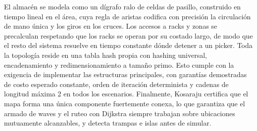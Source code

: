 \documentclass[11pt,a4paper]{article}
\theoremstyle{definition}
\begin{document}
El almacén se modela como un dígrafo ralo de celdas de pasillo, construido en tiempo lineal en el área, cuya regla de aristas codifica con precisión la circulación de mano única y los giros en los cruces. Los accesos a racks y zonas se precalculan respetando que los racks se operan por su costado largo, de modo que el resto del sistema resuelve en tiempo constante dónde detener a un picker. Toda la topología reside en una tabla hash propia con hashing universal, encadenamiento y redimensionamiento a tamaño primo. Esto cumple con la exigencia de implementar las estructuras principales, con garantías demostradas de costo esperado constante, orden de iteración determinista y cadenas de longitud máxima 2 en todos los escenarios. Finalmente, Kosaraju certifica que el mapa forma una única componente fuertemente conexa, lo que garantiza que el armado de waves y el ruteo con Dijkstra siempre trabajan sobre ubicaciones mutuamente alcanzables, y detecta trampas e islas antes de simular.
\end{document}
